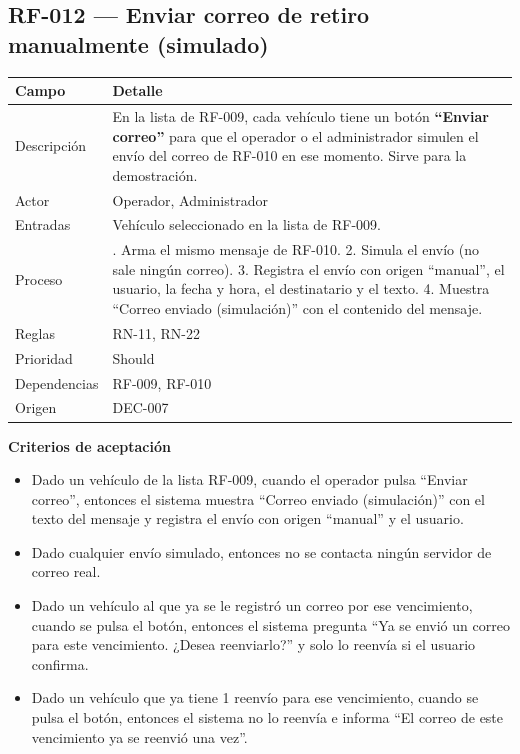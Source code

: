 \subsection{RF-012 — Enviar correo de retiro manualmente (simulado)}
\begin{longtable}{>{\raggedright\arraybackslash}p{3.2cm}>{\raggedright\arraybackslash}p{11.2cm}}
\toprule
\textbf{Campo} & \textbf{Detalle}\\
\midrule\endhead
Descripción & En la lista de RF-009, cada vehículo tiene un botón \textbf{``Enviar correo''} para que el operador o el administrador simulen el envío del correo de RF-010 en ese momento. Sirve para la demostración.\\
Actor & Operador, Administrador\\
Entradas & Vehículo seleccionado en la lista de RF-009.\\
Proceso & 1. Arma el mismo mensaje de RF-010. 2. Simula el envío (no sale ningún correo). 3. Registra el envío con origen ``manual'', el usuario, la fecha y hora, el destinatario y el texto. 4. Muestra ``Correo enviado (simulación)'' con el contenido del mensaje.\\
Reglas & RN-11, RN-22\\
Prioridad & Should\\
Dependencias & RF-009, RF-010\\
Origen & [U] DEC-007\\
\bottomrule
\end{longtable}

\textbf{Criterios de aceptación}
\begin{itemize}
  \item Dado un vehículo de la lista RF-009, cuando el operador pulsa ``Enviar correo'', entonces el sistema muestra ``Correo enviado (simulación)'' con el texto del mensaje y registra el envío con origen ``manual'' y el usuario.
  \item Dado cualquier envío simulado, entonces no se contacta ningún servidor de correo real.
  \item Dado un vehículo al que ya se le registró un correo por ese vencimiento, cuando se pulsa el botón, entonces el sistema pregunta ``Ya se envió un correo para este vencimiento. ¿Desea reenviarlo?'' y solo lo reenvía si el usuario confirma.
  \item Dado un vehículo que ya tiene 1 reenvío para ese vencimiento, cuando se pulsa el botón, entonces el sistema no lo reenvía e informa ``El correo de este vencimiento ya se reenvió una vez''.
\end{itemize}

